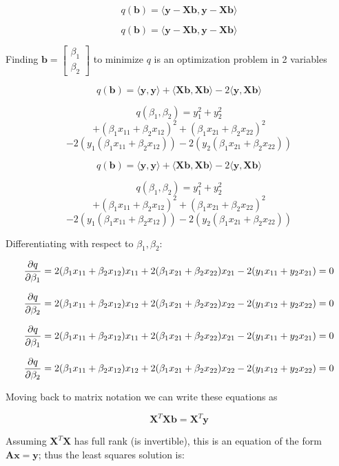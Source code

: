 \documentclass[10pt]{seminar}
\begin{document}
\begin{slide}
  $$q(\mathbf{b})=\langle \mathbf{y}-\mathbf{Xb}, \mathbf{y}-\mathbf{Xb}\rangle$$
  

\newslide
  $$q(\mathbf{b})=\langle \mathbf{y}-\mathbf{Xb}, \mathbf{y}-\mathbf{Xb}\rangle$$

Finding $\mathbf{b}=\begin{bmatrix} \beta_1 \\ \beta_2\end{bmatrix}$  to minimize $q$ is an optimization problem in 2 variables


 $$q(\mathbf{b})=\langle\mathbf{y}, \mathbf{y} \rangle +\langle \mathbf{Xb}, \mathbf{Xb} \rangle -2\langle \mathbf{y}, \mathbf{Xb} \rangle$$

$$q(\beta_1, \beta_2)= y_1^2+y_2^2$$ $$+ (\beta_1 x_{11}+\beta_2 x_{12})^2+(\beta_1 x_{21}+\beta_2 x_{22})^2 $$ $$-2 \left(y_1 (\beta_1 x_{11}+\beta_2 x_{12})\right)-2\left(y_2 (\beta_1 x_{21}+\beta_2 x_{22})\right)$$


\newslide

 $$q(\mathbf{b})=\langle\mathbf{y}, \mathbf{y} \rangle +\langle \mathbf{Xb}, \mathbf{Xb} \rangle -2\langle \mathbf{y}, \mathbf{Xb} \rangle$$

$$q(\beta_1, \beta_2)= y_1^2+y_2^2$$ $$+ (\beta_1 x_{11}+\beta_2 x_{12})^2+(\beta_1 x_{21}+\beta_2 x_{22})^2 $$ $$-2 \left(y_1 (\beta_1 x_{11}+\beta_2 x_{12})\right)-2\left(y_2 (\beta_1 x_{21}+\beta_2 x_{22})\right)$$

Differentiating with respect to $\beta_1, \beta_2$:

$${\partial q\over \partial \beta_1}=2(\beta_1 x_{11}+\beta_2x_{12})x_{11}+2(\beta_1 x_{21}+\beta_2x_{22})x_{21}-2(y_1x_{11}+y_2 x_{21})=0$$

$${\partial q\over \partial \beta_2}=2(\beta_1 x_{11}+\beta_2x_{12})x_{12}+2(\beta_1 x_{21}+\beta_2x_{22})x_{22}-2(y_1x_{12}+y_2 x_{22})=0$$
\newslide

$${\partial q\over \partial \beta_1}=2(\beta_1 x_{11}+\beta_2x_{12})x_{11}+2(\beta_1 x_{21}+\beta_2x_{22})x_{21}-2(y_1x_{11}+y_2 x_{21})=0$$

$${\partial q\over \partial \beta_2}=2(\beta_1 x_{11}+\beta_2x_{12})x_{12}+2(\beta_1 x_{21}+\beta_2x_{22})x_{22}-2(y_1x_{12}+y_2 x_{22})=0$$

Moving back to matrix notation we can write these equations as 


$$ \mathbf{X}^T\mathbf{X} \mathbf{b}= \mathbf{X}^T\mathbf{y}  $$

Assuming $\mathbf{X}^T\mathbf{X} $ has full rank (is invertible), this is an equation of the form $\mathbf{Ax}=\mathbf{y}$; thus the least squares solution is:


\end{slide}
\end{document}

